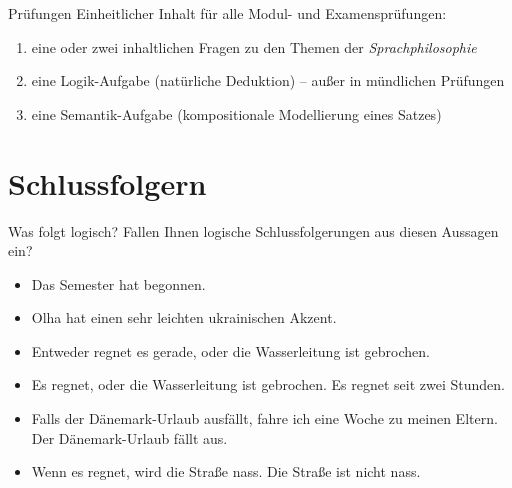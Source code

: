 \begin{frame}
  {Prüfungen}
  \onslide<+->
  \onslide<+->
  Einheitlicher Inhalt für alle Modul- und Examensprüfungen:\\
  \Zeile
  \begin{enumerate}[<+->]
    \item eine oder zwei inhaltlichen Fragen zu den Themen der \textit{Sprachphilosophie}\\
    \item eine Logik-Aufgabe (natürliche Deduktion) -- \alert{außer in mündlichen Prüfungen}
    \item eine Semantik-Aufgabe (kompositionale Modellierung eines Satzes)
  \end{enumerate}
  \Zeile
  \onslide<+->
\end{frame}

\section{Schlussfolgern}

\begin{frame}
  {Was folgt logisch?}
  \onslide<+->
  \onslide<+->
  Fallen Ihnen logische Schlussfolgerungen aus diesen Aussagen ein?\\
  \Halbzeile
  \begin{itemize}[<+->]
    \item Das Semester hat begonnen.
    \item Olha hat einen sehr leichten ukrainischen Akzent.
    \item Entweder regnet es gerade, oder die Wasserleitung ist gebrochen.
    \item Es regnet, oder die Wasserleitung ist gebrochen. Es regnet seit zwei Stunden.
    \item Falls der Dänemark-Urlaub ausfällt, fahre ich eine Woche zu meinen Eltern.\\
      Der Dänemark-Urlaub fällt aus.
    \item Wenn es regnet, wird die Straße nass. Die Straße ist nicht nass.
  \end{itemize}
\end{frame}

